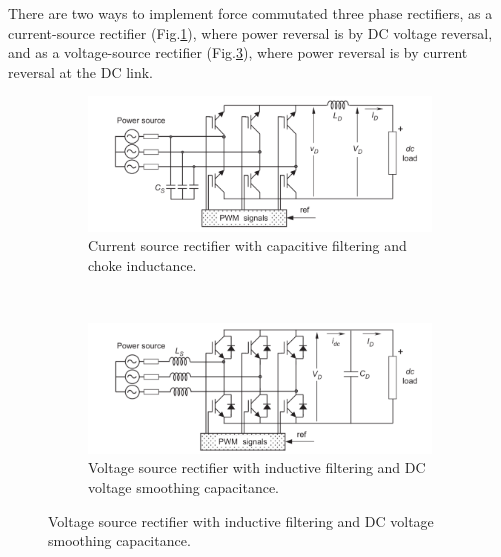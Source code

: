 There are two ways to implement force commutated three phase rectifiers, as a current-source rectifier (Fig.\ref{BASICMPC:fig:CSR}), where power reversal is by DC voltage reversal, and as a voltage-source rectifier (Fig.\ref{BASICMPC:fig:VSR}), where power reversal is by current reversal at the DC link.


\begin{figure}[h]
                \centering
                \begin{subfigure}[b]{0.9\textwidth}
                    \includegraphics[width=\textwidth]{EMPC_PNG_Pics/BasicCurrentRectifiers.png}
                    \caption{\centering Current source rectifier with capacitive filtering and choke inductance.}
                    \label{BASICMPC:fig:CSR}
                \end{subfigure}
                ~ %
                \begin{subfigure}[b]{0.9\textwidth}
                    \includegraphics[width=\textwidth]{EMPC_PNG_Pics/BasicVoltageRectifiers.png}
                    \caption{\centering Voltage source rectifier with inductive filtering and DC voltage smoothing capacitance.}
                    \label{BASICMPC:fig:VSR}
                \end{subfigure}

\end{figure}
